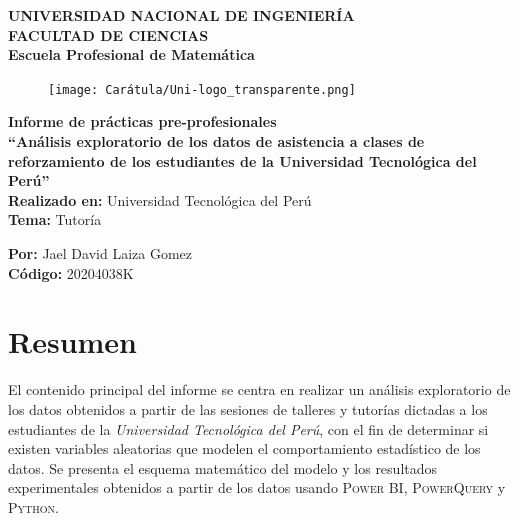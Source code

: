 \documentclass[11pt,a4paper]{book}
\theoremstyle{definition}%
\begin{document}
    \renewcommand{\listtablename}{Índice de tablas}
    \renewcommand{\tablename}{Tabla}
    \thispagestyle{empty}
    \addtocounter{page}{-1}
    \begin{center}
        {\huge \textbf{UNIVERSIDAD NACIONAL DE INGENIERÍA}}\\
    \vspace{0.5cm}
        {\huge \textbf{FACULTAD DE CIENCIAS}}\\
    \vspace{0.25cm}
    {\huge \textbf{Escuela Profesional de Matemática}}\\
    \vspace{0.25cm}
        \begin{figure}[h!]
            \centering
            \texttt{[image: Carátula/Uni-logo\_transparente.png]}
        \end{figure}
    \vspace{0.1cm}
         {\huge \textbf{Informe de prácticas pre-profesionales}}\\
    \vspace{1cm}
    {\huge \textbf{``Análisis exploratorio de los datos de asistencia a clases de reforzamiento de los estudiantes de la Universidad Tecnológica del Perú''}}\\
    \vspace{1cm}
        \LARGE{\textbf{Realizado en: }Universidad Tecnológica del Perú}\\
        \LARGE{\textbf{Tema: }Tutoría}
    \end{center}
    \vspace{1cm}
    
    \begin{center}
        \LARGE{\textbf{Por: }Jael David Laiza Gomez}\\
        \LARGE{\textbf{Código: }20204038K}
    \vspace{1cm}
    
    \date{\LARGE{\today}}
    \makeatletter
    \@date
    \makeatother
    \end{center}
    
    \tableofcontents

    \chapter*{Resumen}
        El contenido principal del informe se centra en realizar un análisis exploratorio de los datos obtenidos a partir de las sesiones de talleres y tutorías dictadas a los estudiantes de la \textit{Universidad Tecnológica del Perú}, con el fin de determinar si existen variables aleatorias que modelen el comportamiento estadístico de los datos. Se presenta el esquema matemático del modelo y los resultados experimentales obtenidos a partir de los datos usando \textsc{Power BI}, \textsc{PowerQuery} y \textsc{Python}.
\end{document}
